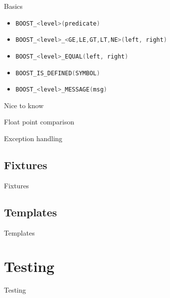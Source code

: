 \documentclass{beamer}
\newcommand{\sectiontitle}[1]{
    \section{#1}
    \begin{frame}
        \centering
        \Huge{#1}
    \end{frame}
}
\newcommand{\inlinecpp}[1]{
    \lstinline[language=C++]{#1}
}
\begin{document}
        \begin{frame}{Basics}
            \begin{itemize}
                \item  \inlinecpp{BOOST_<level>(predicate)}
                \item  \inlinecpp{BOOST_<level>_<GE,LE,GT,LT,NE>(left, right)}
                \item  \inlinecpp{BOOST_<level>_EQUAL(left, right)}
                \item  \inlinecpp{BOOST_IS_DEFINED(SYMBOL)}
                \item  \inlinecpp{BOOST_<level>_MESSAGE(msg)}
            \end{itemize}
        \end{frame}

        \begin{frame}{Nice to know}
            
        \end{frame}

        \begin{frame}{Float point comparison}
            
        \end{frame}

        \begin{frame}{Exception handling}
                  
        \end{frame}

        \subsection{Fixtures}
        \begin{frame}[plain]{Fixtures}
            
        \end{frame}

        \subsection{Templates}
        \begin{frame}[plain]{Templates}
            
        \end{frame}

    \sectiontitle{Testing}
\end{document}

